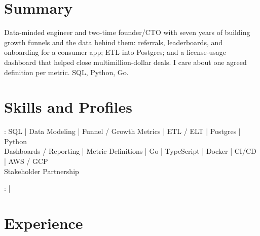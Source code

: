 \documentclass[print]{jack-resume}
\begin{document}
\pagecolor{darkmodeBackground}


\begin{minipage}[t][1cm][t]{.03\textwidth}
    \hfill
\end{minipage}

\section{Summary}
Data-minded engineer and two-time founder/CTO with seven years of building growth funnels and the data behind them: referrals, leaderboards, and onboarding for a consumer app; ETL into Postgres; and a license-usage dashboard that helped close multimillion-dollar deals. I care about one agreed definition per metric. SQL, Python, Go.
\sectionsep

\section{Skills and Profiles}
:
SQL \hfill | \hfill
Data Modeling \hfill | \hfill
Funnel / Growth Metrics \hfill | \hfill
ETL / ELT \hfill | \hfill
Postgres \hfill | \hfill
Python \\
\hspace{1.0cm} Dashboards / Reporting \hfill | \hfill
Metric Definitions \hfill | \hfill
Go \hfill | \hfill
TypeScript \hfill | \hfill
Docker \hfill | \hfill
CI/CD \hfill | \hfill
AWS / GCP \\
\hspace{1.0cm} Stakeholder Partnership \\

\raggedright{
    :
      \href{https://www.linkedin.com/in/jack-sturtevant/}{ \ExternalLink} |
     \href{https://github.com/jacksturt}{ \ExternalLink}}

\section{Experience}
\end{document}
